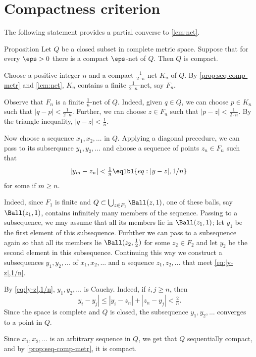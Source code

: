 \section{Compactness criterion}

The following statement provides a partial converse to \ref{lem:net}.

\begin{thm}{Proposition}\label{prop:complete-with-compact-nets}
Let $Q$ be a closed subset in complete metric space.
Suppose that for every \(\eps>0\) there is a compact \(\eps\)-net of \(Q\).
Then \(Q\) is compact.
\end{thm}

Choose a positive integer $n$ and a compact \(\tfrac1{2\cdot n}\)-net \(K_n\) of $Q$.
By \ref{prop:seq-comp-metr} and \ref{lem:net}, $K_n$ contains a finite \(\tfrac1{2\cdot n}\)-net, say $F_n$.

Observe that $F_n$ is a finite \(\tfrac1n\)-net of \(Q\).
Indeed, given \(q\in Q\), we can choose \(p\in K_n\) such that
$|q-p|<\tfrac1{2\cdot n}$.
Further, we can choose \(z\in F_n\) such that
$|p-z|<\tfrac1{2\cdot n}$.
By the triangle inequality, $|q-z|<\tfrac1n$.

Now choose a sequence \(x_1,x_2,\ldots\) in \(Q\).
Applying a diagonal precedure,
we can pass to its subserqunce $y_1,y_2,\ldots$
and choose a sequence of points $z_n\in F_n$ such that
\[|y_m-z_n|<\tfrac 1n\eqlbl{eq:|y-z|,1/n}\]
for some if $m\ge n$.

Indeed, since \(F_1\) is finite and $Q\subset \bigcup_{z\in F_1}\Ball(z,1)$,
one of these balls, say $\Ball(z_1,1)$, contains infinitely many members of the sequence.
Passing to a subsequence, we may assume that all its members lie in $\Ball(z_1,1)$;
let $y_1$ be the first element of this subsequence.
Furhther we can pass to a subsequence again so that all its members lie $\Ball(z_2,\tfrac12)$ for some $z_2\in F_2$ and let $y_2$ be the second element in this subsequence.
Continuing this way we construct a subsequences $y_1,y_2,\ldots$ of \(x_1,x_2,\ldots\) and a sequence $z_1,z_2,\ldots$ that meet \ref{eq:|y-z|,1/n}.

By \ref{eq:|y-z|,1/n}, \(y_1,y_2,\ldots\) is Cauchy.
Indeed, if \(i,j\ge n\), then
\[|y_i-y_j|\le |y_i-z_n|+|z_n-y_j|< \tfrac2n.\]
Since the space is complete and $Q$ is closed, the subsequence \(y_1,y_2,\ldots\) converges to a point in \(Q\).

Since \(x_1,x_2,\ldots\) is an arbitrary sequence in \(Q\), we get that \(Q\) sequentially compact, and by \ref{prop:seq-comp-metr}, it is compact.
\qeds

